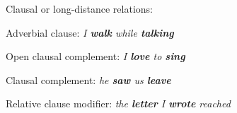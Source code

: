 











Clausal or long-distance relations:
\squishlist
	\item Adverbial clause: \emph{ I \textbf{walk} while \textbf{talking}}
	\item Open clausal complement:  \emph{I \textbf{love} to \textbf{sing} }
	\item  Clausal complement:  \emph{ he \textbf{saw} us \textbf{leave}}
	\item  Relative clause modifier:  \emph{the \textbf{letter} I \textbf{wrote} reached }
\squishend

